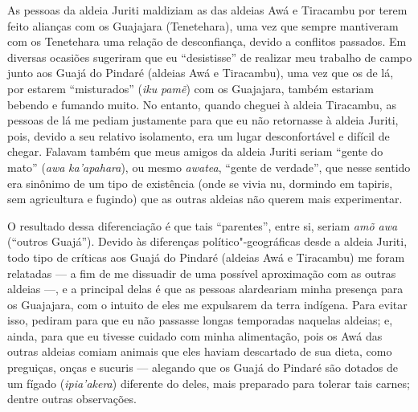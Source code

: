 As pessoas da aldeia Juriti maldiziam as das aldeias Awá e Tiracambu por
terem feito alianças com os Guajajara (Tenetehara), uma vez que sempre
mantiveram com os Tenetehara uma relação de desconfiança, devido a
conflitos passados. Em diversas ocasiões sugeriram que eu ``desistisse''
de realizar meu trabalho de campo junto aos Guajá do Pindaré (aldeias
Awá e Tiracambu), uma vez que os de lá, por estarem ``misturados''
(\emph{iku} \emph{pamẽ}) com os Guajajara, também estariam bebendo e
fumando muito. No entanto, quando cheguei à aldeia Tiracambu, as pessoas
de lá me pediam justamente para que eu não retornasse à aldeia Juriti,
pois, devido a seu relativo isolamento, era um lugar desconfortável e
difícil de chegar. Falavam também que meus amigos da aldeia Juriti
seriam ``gente do mato'' (\emph{awa} \emph{ka'apahara}), ou mesmo
\emph{awatea}, ``gente de verdade'', que nesse sentido era sinônimo de um
tipo de existência (onde se vivia nu, dormindo em tapiris, sem
agricultura e fugindo) que as outras aldeias não querem mais
experimentar.

O resultado dessa diferenciação é que tais ``parentes'', entre si, seriam
\emph{amõ awa} (``outros Guajá''). Devido às diferenças
político"-geográficas desde a aldeia Juriti, todo tipo de críticas aos
Guajá do Pindaré (aldeias Awá e Tiracambu) me foram relatadas --- a fim de
me dissuadir de uma possível aproximação com as outras aldeias ---, e a
principal delas é que as pessoas alardeariam minha presença para os
Guajajara, com o intuito de eles me expulsarem da terra indígena. Para
evitar isso, pediram para que eu não passasse longas temporadas naquelas
aldeias; e, ainda, para que eu tivesse cuidado com minha alimentação,
pois os Awá das outras aldeias comiam animais que eles haviam descartado
de sua dieta, como preguiças, onças e sucuris --- alegando que os Guajá do
Pindaré são dotados de um fígado (\emph{ipia'akera}) diferente do deles,
mais preparado para tolerar tais carnes; dentre outras observações.

